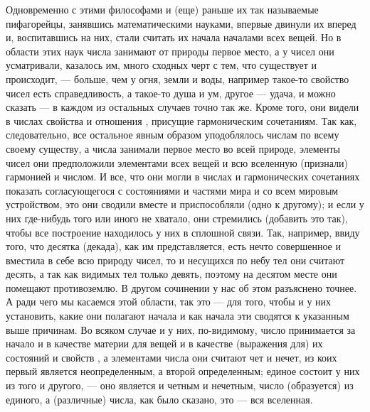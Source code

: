 \documentclass{article}
\begin{document}
Одновременно с этими философами и (еще) раньше их так называемые пифагорейцы, занявшись математическими науками, впервые двинули их вперед и, воспитавшись на них, стали считать их начала началами всех вещей. Но в области этих наук числа занимают от природы первое место, а у чисел они усматривали, казалось им, много сходных черт
\footnotemark[1]
с тем, что существует и происходит, — больше, чем у огня, земли и воды, например такое-то свойство чисел есть справедливость, а такое-то душа и ум, другое — удача, и можно сказать — в каждом из остальных случаев точно так же. Кроме того, они видели в числах свойства и отношения
\footnotemark[2]
, присущие гармоническим сочетаниям. Так как, следовательно, все остальное явным образом уподоблялось числам по всему своему существу, а числа занимали первое место во всей природе, элементы чисел они предположили элементами всех вещей и всю вселенную (признали) гармонией и числом. И все, что они могли в числах и гармонических сочетаниях показать согласующегося с состояниями и частями мира и со всем мировым устройством, это они сводили вместе и приспособляли (одно к другому); и если у них где-нибудь того или иного не хватало, они стремились (добавить это так), чтобы все построение
\footnotemark[3]
находилось у них в сплошной связи. Так, например, ввиду того, что десятка (декада), как им представляется, есть нечто совершенное и вместила в себе всю природу чисел, то и несущихся по небу тел они считают десять, а так как видимых тел только девять, поэтому на десятом месте они помещают противоземлю.
\footnotemark[4]
В другом сочинении у нас об этом разъяснено точнее.
\footnotemark[5]
А ради чего мы касаемся этой области, так это — для того, чтобы и у них установить, какие они полагают начала и как начала эти сводятся к указанным выше причинам. Во всяком случае и у них, по-видимому, число принимается за начало и в качестве материи для вещей и в качестве (выражения для) их состояний и свойств
\footnotemark[6]
, а элементами числа они считают чет и нечет, из коих первый является неопределенным, а второй определенным; единое состоит у них из того и другого, — оно является и четным и нечетным, число (образуется) из единого, а (различные) числа, как было сказано, это — вся вселенная.
\end{document}

